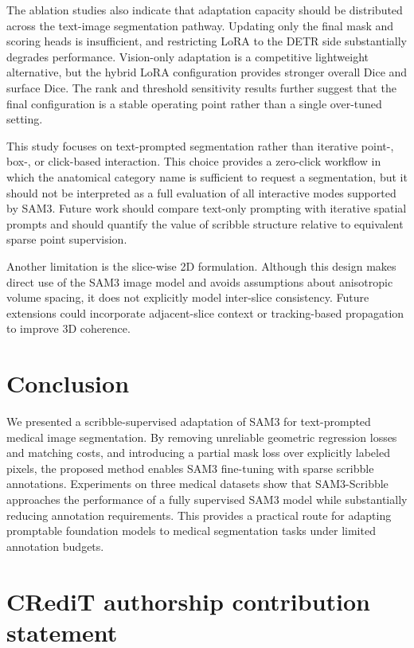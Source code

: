 \documentclass[preprint,12pt]{elsarticle}
\begin{document}
The ablation studies also indicate that adaptation capacity should be distributed across the text-image segmentation pathway. Updating only the final mask and scoring heads is insufficient, and restricting LoRA to the DETR side substantially degrades performance. Vision-only adaptation is a competitive lightweight alternative, but the hybrid LoRA configuration provides stronger overall Dice and surface Dice. The rank and threshold sensitivity results further suggest that the final configuration is a stable operating point rather than a single over-tuned setting.

This study focuses on text-prompted segmentation rather than iterative point-, box-, or click-based interaction. This choice provides a zero-click workflow in which the anatomical category name is sufficient to request a segmentation, but it should not be interpreted as a full evaluation of all interactive modes supported by SAM3. Future work should compare text-only prompting with iterative spatial prompts and should quantify the value of scribble structure relative to equivalent sparse point supervision.

Another limitation is the slice-wise 2D formulation. Although this design makes direct use of the SAM3 image model and avoids assumptions about anisotropic volume spacing, it does not explicitly model inter-slice consistency. Future extensions could incorporate adjacent-slice context or tracking-based propagation to improve 3D coherence.

\section{Conclusion}

We presented a scribble-supervised adaptation of SAM3 for text-prompted medical image segmentation. By removing unreliable geometric regression losses and matching costs, and introducing a partial mask loss over explicitly labeled pixels, the proposed method enables SAM3 fine-tuning with sparse scribble annotations. Experiments on three medical datasets show that SAM3-Scribble approaches the performance of a fully supervised SAM3 model while substantially reducing annotation requirements. This provides a practical route for adapting promptable foundation models to medical segmentation tasks under limited annotation budgets.

\section*{CRediT authorship contribution statement}
\end{document}
